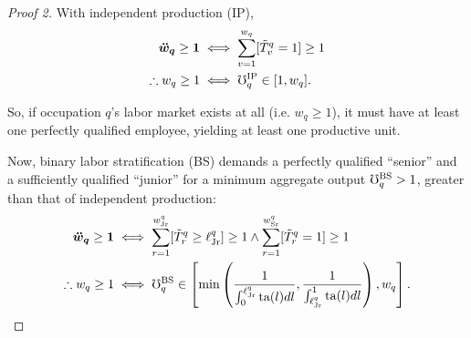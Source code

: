 \documentclass[hidelinks, nonatbib]{elsarticle}
\begin{document}
\begin{lemma}
\begin{proof}[Proof 2]
        With independent production (IP),
        \begin{align}
            \boldsymbol{\ddot{w}_q}
            \geq
            \boldsymbol{1}
            &\iff
            \sum_{v=1}^{w_{q}}
            [\tilde{T}_{v}^{q} = 1]
            \geq
            1
            \\
            \therefore
            w_q \geq 1
            &\iff
            \mho_{q}^{\text{IP}}
            \in [1, w_q]
            .
        \end{align}

        So, if occupation $q$'s labor market exists at all (i.e. $w_q \geq 1$), it must have at least one perfectly qualified employee, yielding at least one productive unit.

        Now, binary labor stratification (BS) demands a perfectly qualified ``senior'' and a sufficiently qualified ``junior'' for a minimum aggregate output $\mho_{q}^{\text{BS}} > 1$, greater than that of independent production:
        \begin{align}
            \boldsymbol{\ddot{w}_q}
            \geq
            \boldsymbol{1}
            &\iff
            \sum_{r=1}^{w_{\text{Jr}}^{q}}
            [\tilde{T}_{r}^{q} \geq \ell_{\text{Jr}}^{q}]
            \geq
            1
            \land
            \sum_{r=1}^{w_{\text{Sr}}^{q}}
            [\tilde{T}_{r}^{q} = 1]
            \geq
            1
            \\
            \therefore
            w_q \geq 1
            &\iff
            \mho_{q}^{\text{BS}}
            \in
            \left[
                \min\left(
                    \frac{
                        1
                    }{
                        \int_{0}^{\ell_{\text{Jr}}^{q}}
                        \text{ta}(l)dl
                    }
                    ,
                    \frac{
                        1
                    }{
                        \int_{\ell_{\text{Jr}}^{q}}^{1}
                        \text{ta}(l)dl
                    }
                \right)
                ,
                w_q
            \right]
            .
        \end{align}


\end{proof}
\end{lemma}
\end{document}
